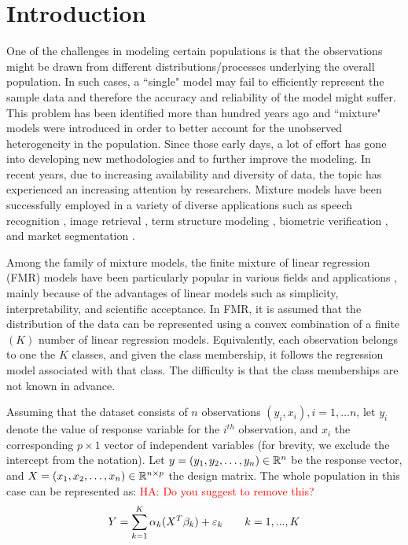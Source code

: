 \documentclass[12pt]{article}
\begin{document}
\section{Introduction}
\label{sec:intro}
One of the challenges in modeling certain populations is that the  observations might be drawn from different distributions/processes underlying the overall population. In such cases, a ``single" model may fail to efficiently represent the sample data and therefore the accuracy and reliability of the model might suffer. This problem has been identified more than hundred years ago \citep{newcomb1886generalized, pearson1894contributions} and ``mixture" models were introduced in order to better account for the unobserved heterogeneity in the population. Since those early days, a lot of effort has gone into developing new methodologies and to further improve the modeling. In recent years, due to increasing  availability and diversity of data, the topic has experienced an increasing attention by researchers. Mixture models have been successfully employed in a variety of diverse applications such as speech recognition \citep{reynolds1995robust}, image retrieval \citep{permuter2003gaussian}, term structure modeling \citep{lemke2006term}, biometric verification \citep{stylianou2005gmm}, and market segmentation \citep{tuma2013finite}.

Among the family of mixture models, the finite mixture of linear regression (FMR) models have been particularly popular in various fields and applications 
\citep{bierbrauer2004modeling, andrews2003retention, bar1978tracking}, mainly because of the advantages of linear models such as simplicity,  interpretability, and scientific acceptance.  In FMR, it is assumed that the distribution of the data can be represented using a convex combination of a finite $(K)$ number of linear regression models. Equivalently, each observation belongs to one the $K$ classes, and given the class membership, it follows the regression model associated with that class. The difficulty is that the class memberships are not known in advance. 

Assuming that the dataset consists of $n$ observations $(y_i,x_i), i=1,\dots n$, let $y_i$ denote the value of response variable for the $i^{th}$ observation, and $x_i$ the corresponding $p \times 1$ vector of independent variables (for brevity, we exclude the intercept from the notation).
Let $y = (y_1, y_2, \dots, y_n) \in \mathbb{R}^n$ be the response vector, and $X= (x_1, x_2, \dots, x_n) \in \mathbb{R}^{n \times p}$ the design matrix.
The whole population in this case can be represented as: 
\textcolor{red}{HA: Do you suggest to remove this?}
%
\begin{align}
Y = \sum_{k=1}^{K} \alpha_k (X^{T} \beta_k)+\varepsilon_k \qquad  k =1,...,K
\end{align}
\end{document}

